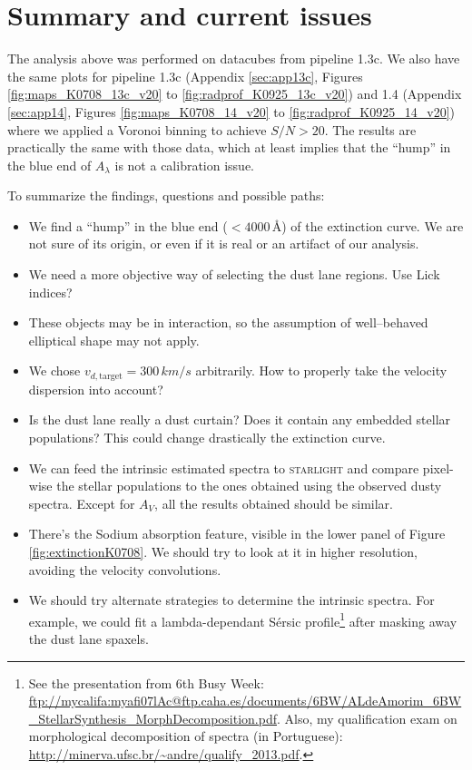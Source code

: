 \documentclass[a4paper]{article}
\newcommand{\angstrom}{\text{\AA}}
\def\starlight{\textsc{starlight}\xspace}
\begin{document}
\section{Summary and current issues}

The analysis above was performed on datacubes from pipeline 1.3c. We also have
the same plots for pipeline 1.3c (Appendix \ref{sec:app13c}, Figures
\ref{fig:maps_K0708_13c_v20} to \ref{fig:radprof_K0925_13c_v20}) and 1.4
(Appendix \ref{sec:app14}, Figures \ref{fig:maps_K0708_14_v20} to
\ref{fig:radprof_K0925_14_v20}) where we applied a Voronoi binning to achieve
$S/N > 20$. The results are practically the same with those data, which at least
implies that the ``hump'' in the blue end of $A_\lambda$ is not a calibration
issue.

To summarize the findings, questions and possible paths:

\begin{itemize} 

\item We find a ``hump'' in the blue end ($< 4000\,\angstrom$) of the extinction
curve. We are not sure of its origin, or even if it is real or an artifact of
our analysis.

\item We need a more objective way of selecting the dust lane regions. Use Lick
indices?

\item These objects may be in interaction, so the assumption of well--behaved
elliptical shape may not apply.

\item We chose $v_{d,\text{target}} = 300\,km/s$ arbitrarily. How to properly
take the velocity dispersion into account?

\item Is the dust lane really a dust curtain? Does it contain any embedded
stellar populations? This could change drastically the extinction curve.

\item We can feed the intrinsic estimated spectra to \starlight and compare
pixel-wise the stellar populations to the ones obtained using the observed dusty spectra.
Except for $A_V$, all the results obtained should be similar.

\item There's the Sodium absorption feature, visible in the lower panel of
Figure \ref{fig:extinctionK0708}. We should try to look at it in higher resolution,
avoiding the velocity convolutions.

\item We should try alternate strategies to determine the intrinsic spectra. For
example, we could fit a lambda-dependant Sérsic profile\footnote{See the
presentation from 6th Busy Week:
\url{ftp://mycalifa:myafi07lAc@ftp.caha.es/documents/6BW/ALdeAmorim_6BW_StellarSynthesis_MorphDecomposition.pdf}.
Also, my qualification exam on morphological decomposition of spectra (in
Portuguese):
\url{http://minerva.ufsc.br/~andre/qualify_2013.pdf}.} after masking away the
dust lane spaxels.

\end{itemize}
\end{document}
